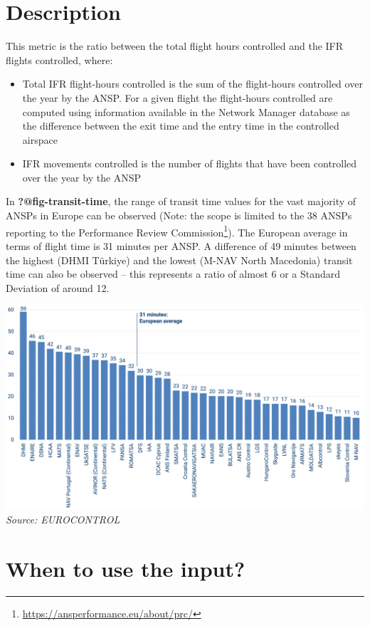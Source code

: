 \documentclass[
  11pt,
  a4paper,
]{book}
\DeclareRobustCommand{\href}[2]{#2\footnote{\url{#1}}}
\begin{document}
\hypertarget{description}{%
\section{Description}\label{description}}

This metric is the ratio between the total flight hours controlled and
the IFR flights controlled, where:

\begin{itemize}
\item
  Total IFR flight-hours controlled is the sum of the flight-hours
  controlled over the year by the ANSP. For a given flight the
  flight-hours controlled are computed using information available in
  the Network Manager database as the difference between the exit time
  and the entry time in the controlled airspace
\item
  IFR movements controlled is the number of flights that have been
  controlled over the year by the ANSP
\end{itemize}

In \textbf{?@fig-transit-time}, the range of transit time values for the
vast majority of ANSPs in Europe can be observed (Note: the scope is
limited to the 38 ANSPs reporting to the
\href{https://ansperformance.eu/about/prc/}{Performance Review
Commission}). The European average in terms of flight time is 31 minutes
per ANSP. A difference of 49 minutes between the highest (DHMI Türkiye)
and the lowest (M-NAV North Macedonia) transit time can also be observed
-- this represents a ratio of almost 6 or a Standard Deviation of around
12.

\includegraphics{./figures/transit_time.svg} \emph{Source: EUROCONTROL}

\hypertarget{when-to-use-the-input-2}{%
\section{When to use the input?}\label{when-to-use-the-input-2}}
\end{document}
